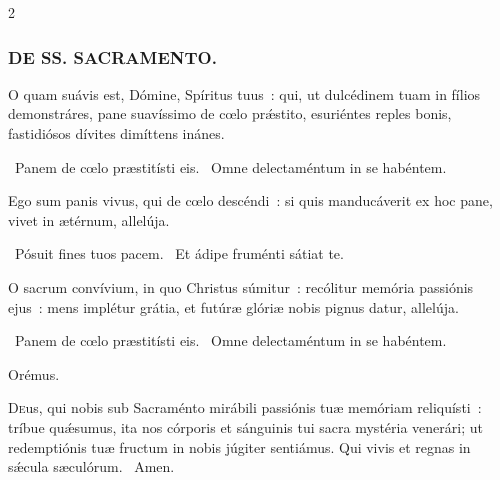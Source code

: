 \documentclass[9pt,twoside]{extarticle}
\begin{document}
\begin{multicols}{2}
{\subsubsection*{\center \textsc{DE SS. SACRAMENTO.}}
\begin{tightlist}{}
\item {}
\item {} O quam suávis est, Dómine, Spíritus tuus~: qui, ut dulcédinem tuam in fílios demonstráres, pane suavíssimo de cœlo prǽstito, esuriéntes reples bonis, fastidiósos dívites dimíttens inánes.
\item {}~Panem de cœlo præstitísti eis. ~Omne delectaméntum in se habéntem.
\item {} Ego sum panis vivus, qui de cœlo descéndi~: si quis manducáverit ex hoc pane, vivet in ætérnum, allelúja.
\item {}~Pósuit fines tuos pacem. ~Et ádipe fruménti sátiat te.
\item {} O sacrum convívium, in quo Christus súmitur~: recólitur memória passiónis ejus~: mens implétur grátia, et futúræ glóriæ nobis pignus datur, allelúja.
\item {}~Panem de cœlo præstitísti eis. ~Omne delectaméntum in se habéntem.
\item Orémus. \hfill {}
\end{tightlist}
\lettrine{D}eus, qui nobis sub Sacraménto mirábili passiónis tuæ memóriam reliquísti~: tríbue quǽsumus, ita nos córporis et sánguinis tui sacra mystéria venerári; ut redemptiónis tuæ fructum in nobis júgiter sentiámus. Qui vivis et regnas in sǽcula sæculórum. ~Amen.

}
\end{multicols}
\end{document}
